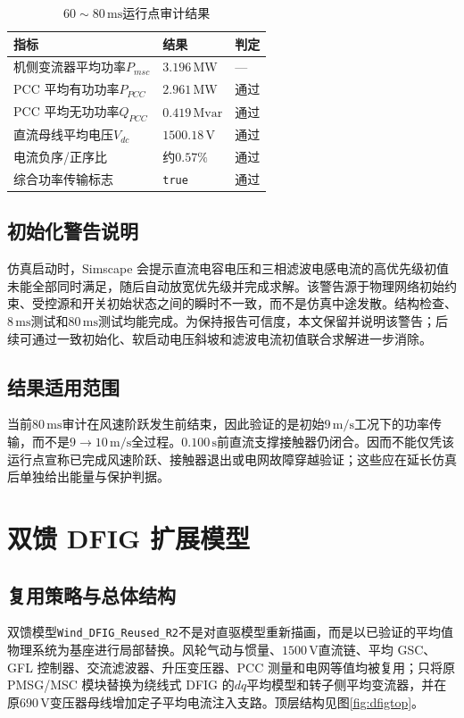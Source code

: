 \documentclass[UTF8,zihao=-4,fontset=none]{ctexrep}
\newcommand{\dfigmodelname}{\texttt{Wind\_DFIG\_Reused\_R2}}
\begin{document}
\begin{table}[H]
\centering
\caption{\(60\sim80\,\mathrm{ms}\)运行点审计结果}
\label{tab:op}
\begin{tabular}{p{6.0cm}p{4.0cm}p{2.5cm}}
\toprule
指标 & 结果 & 判定\\
\midrule
机侧变流器平均功率\(P_{msc}\) & \(3.196\,\mathrm{MW}\) & ---\\
PCC 平均有功功率\(P_{PCC}\) & \(2.961\,\mathrm{MW}\) & 通过\\
PCC 平均无功功率\(Q_{PCC}\) & \(0.419\,\mathrm{Mvar}\) & 通过\\
直流母线平均电压\(V_{dc}\) & \(1500.18\,\mathrm{V}\) & 通过\\
电流负序/正序比 & 约\(0.57\%\) & 通过\\
综合功率传输标志 & \texttt{true} & 通过\\
\bottomrule
\end{tabular}
\end{table}

\section{初始化警告说明}
仿真启动时，Simscape 会提示直流电容电压和三相滤波电感电流的高优先级初值未能全部同时满足，随后自动放宽优先级并完成求解。该警告源于物理网络初始约束、受控源和开关初始状态之间的瞬时不一致，而不是仿真中途发散。结构检查、\(8\,\mathrm{ms}\)测试和\(80\,\mathrm{ms}\)测试均能完成。为保持报告可信度，本文保留并说明该警告；后续可通过一致初始化、软启动电压斜坡和滤波电流初值联合求解进一步消除。

\section{结果适用范围}
当前\(80\,\mathrm{ms}\)审计在风速阶跃发生前结束，因此验证的是初始\(9\,\mathrm{m/s}\)工况下的功率传输，而不是\(9\to10\,\mathrm{m/s}\)全过程。\(0.100\,\mathrm{s}\)前直流支撑接触器仍闭合。因而不能仅凭该运行点宣称已完成风速阶跃、接触器退出或电网故障穿越验证；这些应在延长仿真后单独给出能量与保护判据。

\chapter{双馈 DFIG 扩展模型}
\section{复用策略与总体结构}
双馈模型\dfigmodelname 不是对直驱模型重新描画，而是以已验证的平均值物理系统为基座进行局部替换。风轮气动与惯量、\(1500\,\mathrm{V}\)直流链、平均 GSC、GFL 控制器、交流滤波器、升压变压器、PCC 测量和电网等值均被复用；只将原 PMSG/MSC 模块替换为绕线式 DFIG 的\(dq\)平均模型和转子侧平均变流器，并在原\(690\,\mathrm{V}\)变压器母线增加定子平均电流注入支路。顶层结构见图\ref{fig:dfigtop}。
\end{document}
